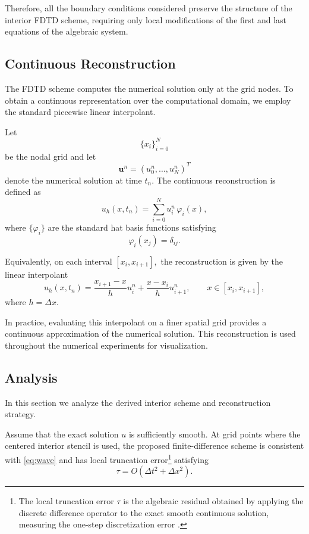 \documentclass{Configuration_Files/PoliMi3i_thesis}
\newif\ifshowthesischanges
\DeclareRobustCommand{\thesischange}[2]{%
    \ifshowthesischanges
        \textcolor{#1}{#2}%
    \else
        #2%
    \fi
}
\def\thesischange#1#2{#2}%
\begin{document}
Therefore, all the boundary conditions considered preserve the structure of the interior FDTD scheme, requiring only local modifications of the first and last equations of the algebraic system.

\subsection{Continuous Reconstruction}

The FDTD scheme computes the numerical solution only at the grid nodes. To
obtain a continuous representation over the computational domain, we employ the
standard piecewise linear interpolant.

Let
\[
\{x_i\}_{i=0}^{N}
\]
be the nodal grid and let
\[
\mathbf u^n=(u_0^n,\ldots,u_N^n)^T
\]
denote the numerical solution at time $t_n$. The continuous reconstruction is
defined as
\begin{equation*}
u_h(x,t_n)
=
\sum_{i=0}^{N}
u_i^n\,\varphi_i(x),
\end{equation*}
where $\{\varphi_i\}$ are the standard hat basis functions satisfying
\[
\varphi_i(x_j)=\delta_{ij}.
\]

Equivalently, on each interval
\(
[x_i,x_{i+1}],
\)
the reconstruction is given by the linear interpolant
\begin{equation*}
u_h(x,t_n)
=
\frac{x_{i+1}-x}{h}u_i^n
+
\frac{x-x_i}{h}u_{i+1}^n,
\qquad
x\in[x_i,x_{i+1}],
\end{equation*}
where
\(
h=\Delta x.
\)

In practice, evaluating this interpolant on a finer spatial grid provides a
continuous approximation of the numerical solution. This reconstruction is used
throughout the numerical experiments for visualization.

\subsection{Analysis}
In this section we analyze the derived interior scheme and reconstruction strategy.

\begin{proposition}
Assume that the exact solution $u$ is sufficiently smooth. At grid points where the centered interior stencil is used, the proposed finite-difference scheme is consistent with \eqref{eq:wave} and has local truncation error\footnote{\thesischange{red}{The local truncation error $\tau$ is the algebraic residual obtained by applying the discrete difference operator to the exact smooth continuous solution, measuring the one-step discretization error \citep{bilbao_numerical_2009}.}} satisfying
\begin{equation*}
\tau
=
O(\Delta t^2+\Delta x^2).
\end{equation*}
\end{proposition}
\end{document}
